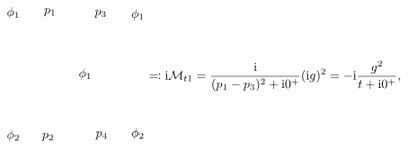 \begin{equation}
\begin{gathered}
\begin{tikzpicture}[x=0.75pt,y=0.75pt,yscale=-1,xscale=1]
            \draw (165.97,77.34) node [anchor=south east] [inner sep=0.75pt]    {$\phi _{1}$};
            \draw (165.97,193.85) node [anchor=north east] [inner sep=0.75pt]    {$\phi _{2}$};
            \draw (188.98,75.05) node [anchor=south west] [inner sep=0.75pt]    {$p_{1}$};
            \draw (186.98,197.14) node [anchor=north west][inner sep=0.75pt]    {$p_{2}$};
            \draw (225.71,135.59) node [anchor=west] [inner sep=0.75pt]    {$\phi _{1}$};
            \draw (257.99,76.63) node [anchor=south east] [inner sep=0.75pt]    {$p_{3}$};
            \draw (258.99,195.55) node [anchor=north east] [inner sep=0.75pt]    {$p_{4}$};
            \draw (281.45,79.34) node [anchor=south west] [inner sep=0.75pt]    {$\phi _{1}$};
            \draw (281.45,191.85) node [anchor=north west][inner sep=0.75pt]    {$\phi _{2}$};
            \end{tikzpicture}            
    \end{gathered} \eqqcolon \ii \mathcal{M}_{t1} = \frac{\ii}{(p_1 - p_3)^2 + \ii 0^+} (\ii g)^2 = - \ii \frac{g^2}{t + \ii 0^+},
\end{equation}
